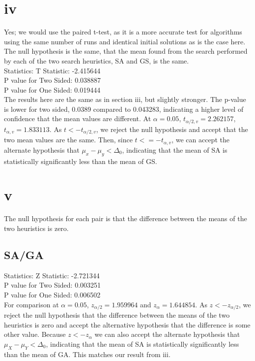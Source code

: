 \documentclass[12pt]{article}
\begin{document}
\section{iv}
Yes; we would use the paired t-test, as it is a more accurate test for algorithms using the same number of runs and identical initial solutions as is the case here. The null hypothesis is the same, that the mean found from the search performed by each of the two search heuristics, SA and GS, is the same. \\

Statistics: T Statistic: -2.415644\\ 
P value for Two Sided: 0.038887\\
P value for One Sided: 0.019444\\

The results here are the same as in section iii, but slightly stronger. The p-value is lower for two sided, 0.0389 compared to 0.043283, indicating a higher level of confidence that the mean values are different. At $\alpha = 0.05$, $t_{\alpha/2,v} = 2.262157$, $t_{\alpha, v}  = 1.833113$. As $t < -t_{\alpha/2,v}$, we reject the null hypothesis and accept that the two mean values are the same. Then, since $t <= -t_{\alpha, v}$, we can accept the alternate hypothesis that $\mu_x - \mu_y < \Delta_0$, indicating that the mean of SA is statistically significantly less than the mean of GS.

\section{v}
The null hypothesis for each pair is that the difference between the means of the two heuristics is zero.
\subsection{SA/GA}
Statistics: Z Statistic: -2.721344\\
P value for Two Sided: 0.003251\\
P value for One Sided: 0.006502\\

For comparison at $\alpha = 0.05$, $z_{\alpha/2}=1.959964$ and $z_{\alpha}=1.644854$.  As $z < -z_{\alpha/2}$, we reject the null hypothesis that the difference between the means of the two heuristics is zero and accept the alternative hypothesis that the difference is some other value.  Because $z<-z_\alpha$ we can also accept the alternate hypothesis that $\mu_X - \mu_Y < \Delta_0$, indicating that the mean of SA is statistically significantly less than the mean of GA.  This matches our result from iii.
\end{document}

